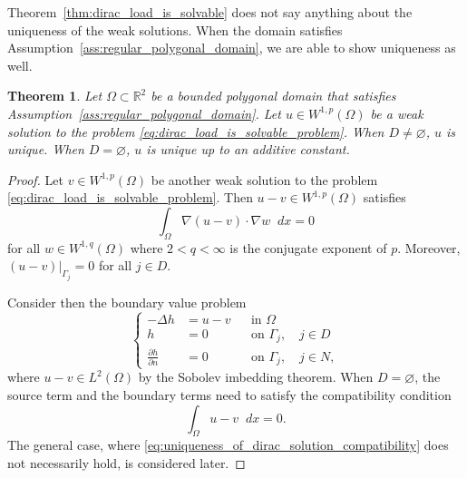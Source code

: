 \documentclass[english, 12pt, a4paper, sci, utf8, a-2b, online]{aaltothesis}
\theoremstyle{definition}
\theoremstyle{plain}
\newtheorem{theorem}{Theorem}[section]
\newcommand*\diff{\mathop{}\!d}
\numberwithin{equation}{section}
\begin{document}
Theorem~\ref{thm:dirac_load_is_solvable} does not say anything about
the uniqueness of the weak solutions. When the domain satisfies
Assumption~\ref{ass:regular_polygonal_domain}, we are able to show
uniqueness as well.
\begin{theorem}
    \label{thm:uniqueness_of_dirac_solution}
    Let $\Omega \subset \mathbb{R}^2$ be a bounded polygonal domain
    that satisfies Assumption~\ref{ass:regular_polygonal_domain}.
    Let $u \in W^{1,p}(\Omega)$ be a weak solution to the problem
    \eqref{eq:dirac_load_is_solvable_problem}.
    When $D \neq \varnothing$, $u$ is unique.
    When $D = \varnothing$, $u$ is unique up to an additive constant.
\end{theorem}
\begin{proof}
    Let $v \in W^{1,p}(\Omega)$ be another weak solution to the problem
    \eqref{eq:dirac_load_is_solvable_problem}.
    Then $u - v \in W^{1,p}(\Omega)$ satisfies
    \begin{equation}
        \label{eq:uniqueness_of_dirac_solution_intmed1}
        \int_{\Omega} \nabla (u-v) \cdot \nabla w \diff x = 0
    \end{equation}
    for all $w \in W^{1,q}(\Omega)$ where $2 < q < \infty$ is the conjugate
    exponent of $p$. Moreover, $(u-v)|_{\Gamma_j} = 0$ for all $j \in D$.

    Consider then the boundary value problem
    \begin{equation}
        \label{eq:uniqueness_of_dirac_solution_aux_problem}
        \left\{
            \begin{aligned}
                -\Delta h &= u-v && \text{in } \Omega \\
                h &= 0 && \text{on } \Gamma_j, \quad j \in D \\
                \frac{\partial h}{\partial n} &= 0 && \text{on } \Gamma_j,
                \quad j \in N,
            \end{aligned}
        \right.
    \end{equation}
    where $u-v \in L^2(\Omega)$ by the Sobolev imbedding theorem.
    When $D = \varnothing$, the source term and the boundary terms need
    to satisfy the compatibility condition
    \begin{equation}
        \label{eq:uniqueness_of_dirac_solution_compatibility}
        \int_{\Omega} u - v \diff x = 0.
    \end{equation}
    The general case, where \eqref{eq:uniqueness_of_dirac_solution_compatibility}
    does not necessarily hold, is considered later.


\end{proof}
\end{document}
